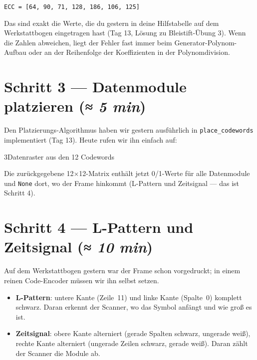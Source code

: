 \begin{center}
\texttt{ECC = [64, 90, 71, 128, 186, 106, 125]}
\end{center}

Das sind exakt die Werte, die du gestern in deine Hilfstabelle auf
dem Werkstattbogen eingetragen hast (Tag 13, Lösung zu
Bleistift-Übung 3). Wenn die Zahlen abweichen, liegt der Fehler
fast immer beim Generator-Polynom-Aufbau oder an der Reihenfolge
der Koeffizienten in der Polynomdivision.

\section{Schritt 3 — Datenmodule platzieren \normalfont(\textit{≈ 5 min})}

Den Platzierungs-Algorithmus haben wir gestern ausführlich in
\texttt{place\_codewords} implementiert (Tag 13). Heute rufen wir ihn
einfach auf:

\begin{pythoneinheit}{3}{Datenraster aus den 12 Codewords}

Die zurückgegebene 12$\times$12-Matrix enthält jetzt 0/1-Werte für
alle Datenmodule und \texttt{None} dort, wo der Frame hinkommt
(L-Pattern und Zeitsignal — das ist Schritt 4).
\end{pythoneinheit}

\section{Schritt 4 — L-Pattern und Zeitsignal \normalfont(\textit{≈ 10 min})}

Auf dem Werkstattbogen gestern war der Frame schon vorgedruckt; in
einem reinen Code-Encoder müssen wir ihn selbst setzen.

\begin{itemize}
\item \textbf{L-Pattern}: untere Kante (Zeile~11) und linke Kante
  (Spalte~0) komplett schwarz. Daran erkennt der Scanner, wo das
  Symbol anfängt und wie groß es ist.
\item \textbf{Zeitsignal}: obere Kante alterniert (gerade Spalten
  schwarz, ungerade weiß), rechte Kante alterniert (ungerade Zeilen
  schwarz, gerade weiß). Daran zählt der Scanner die Module ab.
\end{itemize}

